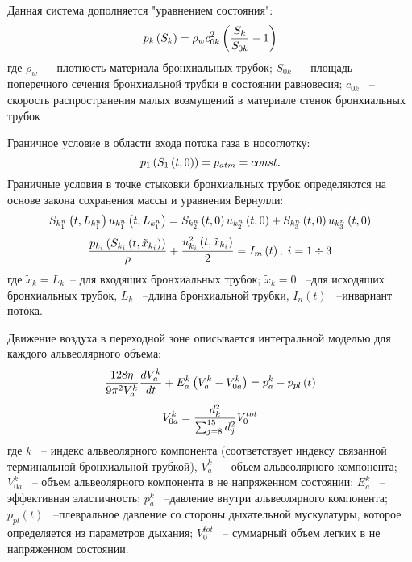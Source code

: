Данная система дополняется "уравнением состояния":
\begin{equation} 
p_{k} \left(S_{k} \right)=\rho _{w} c_{0k}^{2} \left(\frac{S_{k} }{S_{0k} } -1\right)\notag  
\end{equation} 
где $\rho _{w} $ ~-- плотность материала бронхиальных трубок; $S_{0k} $ ~-- площадь поперечного сечения бронхиальной трубки в состоянии равновесия; $c_{0k} $ ~-- скорость распространения малых возмущений в материале стенок бронхиальных трубок

Граничное условие в области входа потока газа в носоглотку: 
\begin{equation}
p_{1} \left(S_{1} \left(t,0\right)\right)=p_{atm} =const. \notag 
\end{equation} 
Граничные условия в точке стыковки бронхиальных трубок определяются на основе закона сохранения массы и уравнения Бернулли:  
\begin{equation} 
S_{k_{1}^{n} } \left(t,L_{k_{1}^{n} } \right)u_{k_{1}^{n} } \left(t,L_{k_{1}^{n} } \right)=S_{k_{2}^{n} } \left(t,0\right)u_{k_{2}^{n} } \left(t,0\right)+S_{k_{3}^{n} } \left(t,0\right)u_{k_{3}^{n} } \left(t,0\right)\notag
\end{equation} 
\begin{equation} 
\frac{p_{k_{i} } \left(S_{k_{i} } \left(t,\tilde{x}_{k_{i} } \right)\right)}{\rho } +\frac{u_{k_{i} }^{2} \left(t,\tilde{x}_{k_{i} } \right)}{2} =I_{m} \left(t\right),\; i=1\div 3\notag 
\end{equation} 
где $\tilde{x}_{k} =L_{k} $~-- для входящих бронхиальных трубок; $\tilde{x}_{k} =0$ ~--для исходящих бронхиальных трубок, $L_{k} $ ~--длина бронхиальной трубки, $I_{n} \left(t\right)$ ~--инвариант потока.


Движение воздуха в переходной зоне описывается интегральной моделью для каждого альвеолярного объема:
\begin{equation} 
\frac{128\eta }{9\pi ^{2} V_{a}^{k} } \frac{dV_{a}^{k} }{dt} +E_{a}^{k} \left(V_{a}^{k} -V_{0a}^{k} \right)=p_{a}^{k} -p_{pl} \left(t\right) \notag
\end{equation} 
\begin{equation} 
V_{0a}^{k} = \frac{d_{k}^{2}}{\sum_{j=8}^{15} d^{2}_{j}}V_{0}^{tot} \notag
\end{equation}
где $k$ ~-- индекс альвеолярного компонента (соответствует индексу связанной терминальной бронхиальной трубкой), $V_{a}^{k} $ ~-- объем альвеолярного компонента; $V_{0a}^{k} $ ~-- объем альвеолярного компонента в не напряженном состоянии; $E_{a}^{k} $ ~--эффективная эластичность; $p_{a}^{k} $ ~--давление внутри альвеолярного компонента; $p_{pl} \left(t\right)$ ~--плевральное давление со стороны дыхательной мускулатуры, которое определяется из параметров дыхания; $V_{0}^{tot} $ ~-- суммарный объем легких в не напряженном состоянии.

